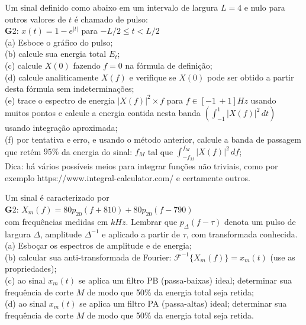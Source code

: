 \documentclass[10pt, a4paper]{article}
\begin{document}
\vspace{\baselineskip}
 Um sinal definido como abaixo em um intervalo de largura $L = 4$ e nulo para outros valores de $t$ é chamado de pulso:\\
{\textbf G2:} $x(t) = 1 - e^{|t|}$ para $- L/2 \leq t < L/2$\\
(a) Esboce o gráfico do pulso;\\
(b) calcule sua energia total $E_{t}$;\\
(c) calcule $X(0)$ fazendo $f = 0$ na fórmula de definição;\\
(d) calcule analiticamente $X(f)$ e verifique se $X(0)$ pode ser obtido a partir desta fórmula sem indeterminações;\\
(e) trace o espectro de energia $|X(f)|^{2} \times f$ para $f \in [-1\,+ 1]Hz$ usando muitos pontos e calcule a energia contida nesta banda $(\int_{-1}^{1} |X(f)|^{2}\,dt)$ usando integração aproximada;\\
(f) por tentativa e erro, e usando o método anterior, calcule a banda de passagem que retém $95\%$ da energia do sinal: $f_{M}$ tal que $\int_{-f_{M}}^{f_{M}} |X(f)|^{2}\,df$;\\
Dica: há vários possíveis meios para integrar funções não triviais, como por exemplo https://www.integral-calculator.com/ e certamente outros.

\vspace{\baselineskip}
 Um sinal é caracterizado por\\
{\textbf G2:} $ X_{m}(f) = 80p_{20}(f + 810) + 80p_{20}(f - 790) $\\
com frequências medidas em $kHz$. Lembrar que $p_{\Delta}(f - \tau)$ denota um pulso de largura $\Delta$, amplitude $\Delta^{-1}$ e aplicado a partir de $\tau$, com transformada conhecida.\\
(a) Esboçar os espectros de amplitude e de energia;\\
(b) calcular sua anti-transformada de Fourier: $\mathcal{F}^{-1} \{X_{m}(f)\} = x_{m}(t)$ (use as propriedades);\\
(c) ao sinal $x_{m}(t)$ se aplica um filtro PB (passa-baixas) ideal; determinar sua frequência de corte $M$ de modo que 50\% da energia total seja retida;\\
(d) ao sinal $x_{m}(t)$ se aplica um filtro PA (passa-altas) ideal; determinar sua frequência de corte $M$ de modo que 50\% da energia total seja retida.
\end{document}
